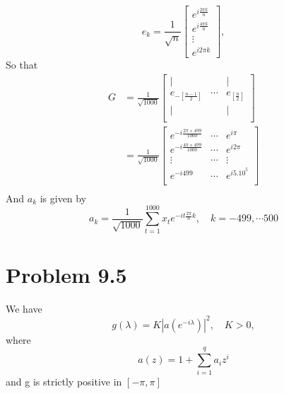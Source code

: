 \documentclass[11pt, oneside]{article}   	%
\begin{document}
\begin{equation}
e_{k} = \frac{1}{\sqrt{n}}
\begin{bmatrix}
    e^{i\frac{2\pi k}{n}} \\
     e^{i\frac{4\pi k}{n}}\\
     \vdots \\
      e^{i2\pi k}
\end{bmatrix},
\end{equation}
So that 
\begin{equation}
\begin{split}
G &= \frac{1}{\sqrt{1000}}
\begin{bmatrix}
    | & & | \\
    e_{-\left[ \frac{n-1}{2}\right]}&\cdots & e_{\left[ \frac{n}{2}\right]}\\
     | & & |\\
\end{bmatrix}\\
&= \frac{1}{\sqrt{1000}}
\begin{bmatrix}
    e^{-i\frac{2\pi\times 499}{1000}} & \cdots& e^{i\pi} \\
     e^{-i\frac{4\pi\times 499}{1000}}&\cdots & e^{i2\pi}\\
     \vdots & \cdots & \vdots\\
      e^{-i499}& \cdots & e^{i5.10^{5}}\\
\end{bmatrix}\\
\end{split}
\end{equation}
\justify
And $a_{k}$ is given by 
\begin{equation}
a_{k} = \frac{1}{\sqrt{1000}}\sum_{t=1}^{1000}x_{t}e^{-it\frac{2\pi}{n}k}, \quad k=-499, \cdots 500
\end{equation}



\section{Problem 9.5}
We have 
\begin{equation}
g(\lambda) = K| a(e^{-i\lambda})  |^{2}, \quad K>0,
\end{equation}
where 
\begin{equation}
a(z) = 1+ \sum_{i=1}^{q}a_{i}z^{i}
\end{equation}
and g is strictly positive in $[-\pi, \pi]$
\end{document}
